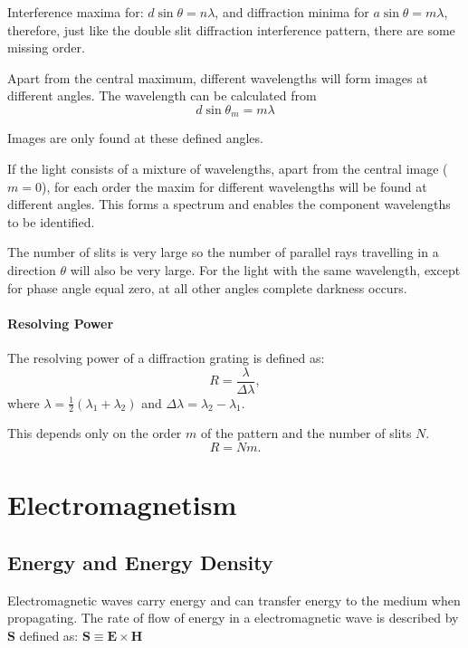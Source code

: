 \documentclass[UTF8]{book}
\begin{document}
Interference maxima for: $d\sin \theta=n\lambda $, and diffraction minima for $a\sin \theta =m\lambda $, therefore, just like the double slit diffraction interference pattern, there are some missing order.

Apart from the central maximum, different wavelengths will form images at different angles. The wavelength can be calculated from
\[d\sin \theta _m=m\lambda\]

Images are only found at these defined angles.

If the light consists of a mixture of wavelengths, apart from the central image ($m = 0$), for each order the maxim for different wavelengths will be found at different angles. This forms a spectrum and enables the component wavelengths to be identified.

The number of slits is very large so the number of parallel rays travelling in a direction $\theta $ will also be very large. For the light with the same wavelength, except for phase angle equal zero, at all other angles complete darkness occurs.


\subsubsection{Resolving Power}
The resolving power of a diffraction grating is defined as:
\[R=\frac{\lambda }{\Delta \lambda},\]
where $\lambda =\frac{1}{2}(\lambda _1+\lambda _2)$ and $\Delta \lambda =\lambda _2-\lambda _1$.

This depends only on the order $m$ of the pattern and the number of slits $N$.
\[R=Nm.\]




\appendix
\chapter{Electromagnetism}
\section{Energy and Energy Density}
Electromagnetic waves carry energy and can transfer energy to the medium when propagating. The rate of flow of energy in a electromagnetic wave is described by $\mathbf{S}$ defined as: $\mathbf{S}\equiv \mathbf{E}\times \mathbf{H}$
\end{document}
